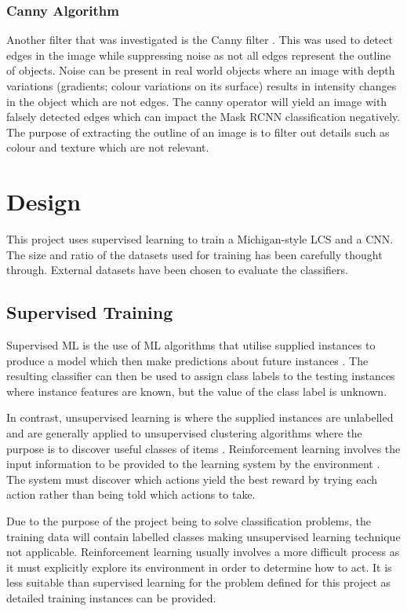 \subsection{Canny Algorithm}

Another filter that was investigated is the Canny filter \cite{canny1986computational}. This was used to detect edges in the image while suppressing noise as not all edges represent the outline of objects. Noise can be present in real world objects where an image with depth variations (gradients; colour variations on its surface) results in intensity changes in the object which are not edges. The canny operator will yield an image with falsely detected edges which can impact the Mask RCNN classification negatively. The purpose of extracting the outline of an image is to filter out details such as colour and texture which are not relevant.

\chapter{Design}
This project uses supervised learning to train a Michigan-style LCS and a CNN. The size and ratio of the datasets used for training has been carefully thought through. External datasets have been chosen to evaluate the classifiers.

\section{Supervised Training}
\label{subsec:supervised}
Supervised ML is the use of ML algorithms that utilise supplied instances to produce a model which then make predictions about future instances \cite{kotsiantis2007supervised}. The resulting classifier can then be used to assign class labels to the testing instances where instance features are known, but the value of the class label is unknown.  

In contrast, unsupervised learning is where the supplied instances are unlabelled and are generally applied to unsupervised clustering algorithms where the purpose is to discover useful classes of items \cite{jain1999data}. 
Reinforcement learning involves the input information to be provided to the learning system by the environment \cite{barto1997reinforcement}. The system must discover which actions yield the best reward by trying each action rather than being told which actions to take. 

Due to the purpose of the project being to solve classification problems, the training data will contain labelled classes making unsupervised learning technique not applicable. Reinforcement learning usually involves a more difficult process as it must explicitly explore its environment in order to determine how to act.  It is less suitable than supervised learning for the problem defined for this project as detailed training instances can be provided.

